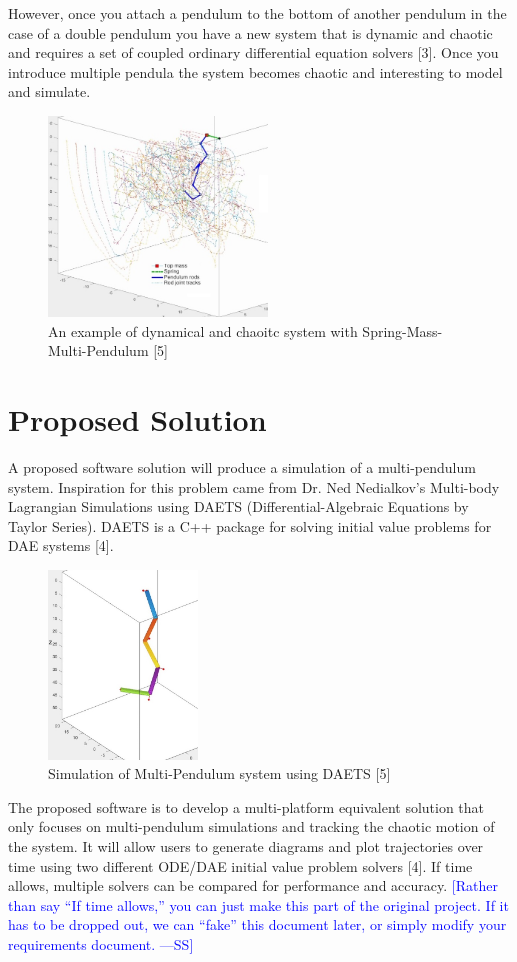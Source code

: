 \documentclass{article}
\newcommand{\authornote}[3]{\textcolor{#1}{[#3 ---#2]}}
\newcommand{\authornote}[3]{}
\newcommand{\wss}[1]{\authornote{blue}{SS}{#1}}
\begin{document}
However, once you attach a pendulum to the bottom of another pendulum in the case of a double pendulum you have a new system that is dynamic and chaotic and requires a set of coupled ordinary differential equation solvers [3]. Once you introduce multiple pendula the system becomes chaotic and interesting to model and simulate.

\begin{figure}[H]
	\centering
	\includegraphics[width=220px]{multi-pend.jpg}
	\caption{An example of dynamical and chaoitc system with Spring-Mass-Multi-Pendulum [5]}
	\label{fig:maxresdefault}
\end{figure}

\section*{Proposed Solution}
A proposed software solution will produce a simulation of a multi-pendulum system. Inspiration for this problem came from Dr. Ned Nedialkov's Multi-body Lagrangian Simulations using DAETS (Differential-Algebraic Equations by Taylor Series). DAETS is a C++ package for solving initial value problems for DAE systems [4].

\begin{figure}[H]
	\centering
	\includegraphics[width=150px]{3pend.jpg}
	\caption{Simulation of Multi-Pendulum system using DAETS [5]}
	\label{fig:maxresdefault}
\end{figure}

The proposed software is to develop a multi-platform equivalent solution that
only focuses on multi-pendulum simulations and tracking the chaotic motion of
the system. It will allow users to generate diagrams and plot trajectories over
time using two different ODE/DAE initial value problem solvers [4]. If time
allows, multiple solvers can be compared for performance and
accuracy. \wss{Rather than say ``If time allows,''  you can just make this part
  of the original project.  If it has to be dropped out, we can ``fake'' this
  document later, or simply modify your requirements document.}
\end{document}
